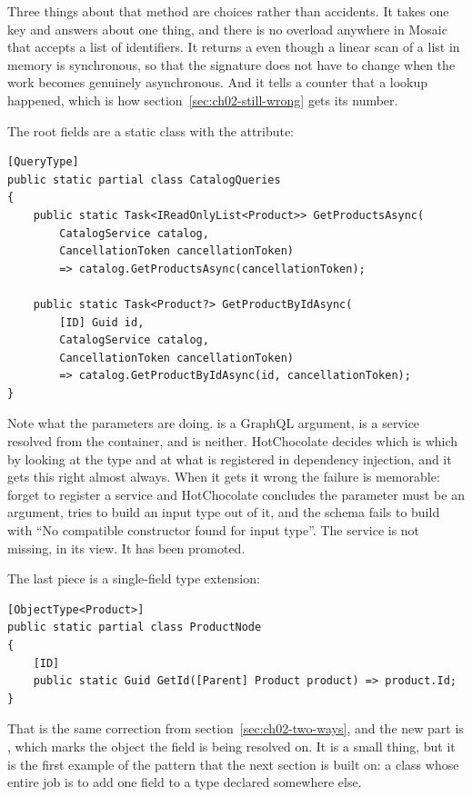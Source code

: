 Three things about that method are choices rather than accidents. It takes one
key and answers about one thing, and there is no overload anywhere in Mosaic
that accepts a list of identifiers. It returns a  even though a
linear scan of a list in memory is synchronous, so that the signature does not
have to change when the work becomes genuinely asynchronous. And it tells a
counter that a lookup happened, which is how
section~\ref{sec:ch02-still-wrong} gets its number.

The root fields are a static class with the \code{[QueryType]} attribute:

\begin{verbatim}
[QueryType]
public static partial class CatalogQueries
{
    public static Task<IReadOnlyList<Product>> GetProductsAsync(
        CatalogService catalog,
        CancellationToken cancellationToken)
        => catalog.GetProductsAsync(cancellationToken);

    public static Task<Product?> GetProductByIdAsync(
        [ID] Guid id,
        CatalogService catalog,
        CancellationToken cancellationToken)
        => catalog.GetProductByIdAsync(id, cancellationToken);
}
\end{verbatim}

%
Note what the parameters are doing.  is a GraphQL argument,
 is a service resolved from the container, and
 is neither. HotChocolate decides which is which by
looking at the type and at what is registered in dependency injection, and it
gets this right almost always. When it gets it wrong the failure is memorable:
forget to register a service and HotChocolate concludes the parameter must be an
argument, tries to build an input type out of it, and the schema fails to build
with \enquote{No compatible constructor found for input type}. The service is
not missing, in its view. It has been promoted.

%
The last piece is a single-field type extension:

\begin{verbatim}
[ObjectType<Product>]
public static partial class ProductNode
{
    [ID]
    public static Guid GetId([Parent] Product product) => product.Id;
}
\end{verbatim}

That is the same \code{[ID]} correction from
section~\ref{sec:ch02-two-ways}, and the new part is \code{[Parent]}, which
marks the object the field is being resolved on. It is a small thing, but it is
the first example of the pattern that the next section is built on: a class
whose entire job is to add one field to a type declared somewhere else.

